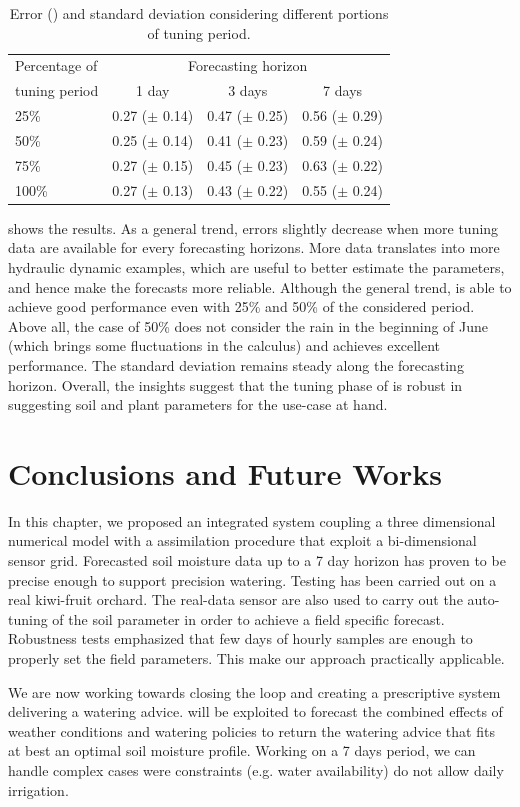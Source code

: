 \begin{table}[H]
\centering
\begin{tabular}{p{3cm}|ccc}
\toprule
Percentage of & \multicolumn{3}{c}{Forecasting horizon} \\
 tuning period & \multicolumn{1}{c|}{1 day} & \multicolumn{1}{c|}{3 days} & \multicolumn{1}{c}{7 days} \\ \midrule
25\%  & 0.27 ($\pm$ 0.14) & 0.47 ($\pm$ 0.25) & 0.56 ($\pm$ 0.29) \\
50\% & 0.25 ($\pm$ 0.14) & 0.41 ($\pm$ 0.23) & 0.59 ($\pm$ 0.24) \\
75\% & 0.27 ($\pm$ 0.15) & 0.45 ($\pm$ 0.23) & 0.63 ($\pm$ 0.22) \\
100\% & 0.27 ($\pm$ 0.13) & 0.43 ($\pm$ 0.22) & 0.55 ($\pm$ 0.24) \\ \bottomrule
\end{tabular}

\caption{Error () and standard deviation considering different portions of tuning period.}
\label{orchard-tbl:tuning_budget}
\end{table}

 shows the results. As a general trend, errors slightly decrease when more tuning data are available for every forecasting horizons. More data translates into more hydraulic dynamic examples, which are useful to better estimate the parameters, and hence make the forecasts more reliable.
Although the general trend, \olab{} is able to achieve good performance even with 25\% and 50\% of the considered period.
Above all, the case of 50\% does not consider the rain in the beginning of June (which brings some fluctuations in the calculus) and achieves excellent performance.
The standard deviation remains steady along the forecasting horizon.
Overall, the insights suggest that the tuning phase of \olab{} is robust in suggesting soil and plant parameters for the use-case at hand.


\section{Conclusions and Future Works}
In this chapter, we proposed an integrated system coupling a three dimensional numerical model with a assimilation procedure that exploit a bi-dimensional sensor grid. Forecasted soil moisture data up to a 7 day horizon has proven to be precise enough to support precision watering. Testing has been carried out on a real kiwi-fruit orchard. The real-data sensor are also used to carry out the auto-tuning of the soil parameter in order to achieve a field specific forecast. Robustness tests emphasized that few days of hourly samples are enough to properly set the field parameters. This make our approach practically applicable. 

We are now working towards closing the loop and creating a prescriptive system delivering a watering advice. \olab{} will be exploited to forecast the combined effects of weather conditions and watering policies to return the watering advice that fits at best an optimal soil moisture profile.  Working on a 7 days period, we can handle complex cases were constraints (e.g. water availability) do not allow daily irrigation.

